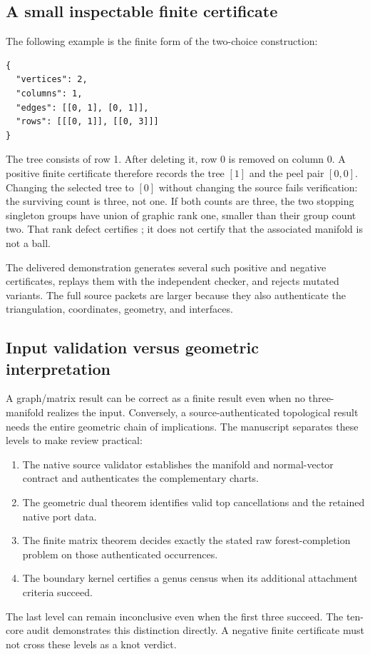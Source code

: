 \subsection{A small inspectable finite certificate}
The following example is the finite form of the two-choice construction:
\begin{verbatim}
{
  "vertices": 2,
  "columns": 1,
  "edges": [[0, 1], [0, 1]],
  "rows": [[[0, 1]], [[0, 3]]]
}
\end{verbatim}
The tree consists of row 1.  After deleting it, row 0 is removed on
column 0.  A positive finite certificate therefore records the tree
$[1]$ and the peel pair $[0,0]$.  Changing the selected tree to $[0]$
without changing the source fails verification: the surviving count is
three, not one.  If both counts are three, the two stopping singleton
groups have union of graphic rank one, smaller than their group count
two.  That rank defect certifies ; it does not certify
that the associated manifold is not a ball.

The delivered demonstration generates several such positive and negative
certificates, replays them with the independent checker, and rejects
mutated variants.  The full source packets are larger because they also
authenticate the triangulation, coordinates, geometry, and interfaces.

\subsection{Input validation versus geometric interpretation}
A graph/matrix result can be correct as a finite result even when no
three-manifold realizes the input.  Conversely, a source-authenticated
topological result needs the entire geometric chain of implications.
The manuscript separates these levels to make review practical:
\begin{enumerate}
\item The native source validator establishes the manifold and normal-vector
  contract and authenticates the complementary charts.
\item The geometric dual theorem identifies valid top cancellations and
  the retained native port data.
\item The finite matrix theorem decides exactly the stated raw
  forest-completion problem on those authenticated occurrences.
\item The boundary kernel certifies a genus census when its additional
  attachment criteria succeed.
\end{enumerate}
The last level can remain inconclusive even when the first three succeed.
The ten-core audit demonstrates this distinction directly.  A negative
finite certificate must not cross these levels as a knot verdict.

